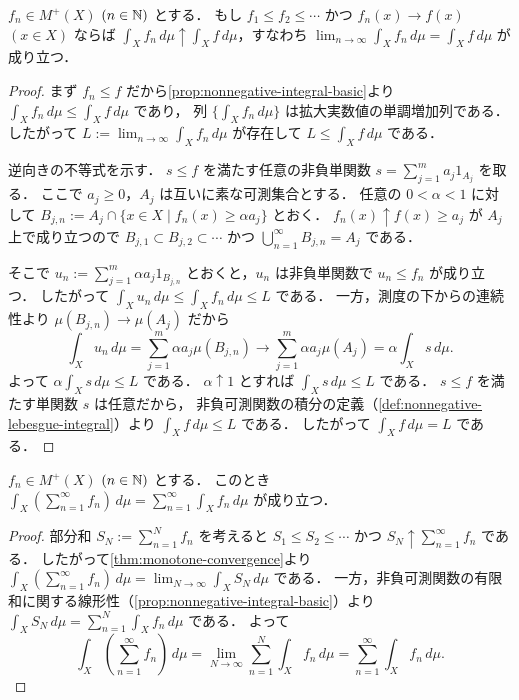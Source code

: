 \begin{theorem}[単調収束定理]\label{thm:monotone-convergence}
$f_n\in M^+(X)$ $(n\in\mathbb N)$ とする．
もし $f_1\le f_2\le \cdots$ かつ $f_n(x)\to f(x)$ $(x \in X)$ ならば
$\int_X f_n\,d\mu \uparrow \int_X f\,d\mu$，すなわち
$\lim_{n\to\infty}\int_X f_n\,d\mu=\int_X f\,d\mu$ が成り立つ．
\end{theorem}
\begin{proof}
まず $f_n \le f$ だから\cref{prop:nonnegative-integral-basic}より
$\int_X f_n\,d\mu\le \int_X f\,d\mu$ であり，
列 $\{\int_X f_n\,d\mu\}$ は拡大実数値の単調増加列である．
したがって $L:=\lim_{n\to\infty}\int_X f_n\,d\mu$ が存在して $L\le \int_X f\,d\mu$ である．

逆向きの不等式を示す．
$s \le f$ を満たす任意の非負単関数 $s=\sum_{j=1}^m a_j1_{A_j}$ を取る．
ここで $a_j\ge 0$，$A_j$ は互いに素な可測集合とする．
任意の $0<\alpha<1$ に対して
$B_{j,n}:=A_j \cap \{x \in X \mid f_n(x)\ge \alpha a_j\}$ とおく．
$f_n(x)\uparrow f(x)\ge a_j$ が $A_j$ 上で成り立つので
$B_{j,1}\subset B_{j,2}\subset \cdots$ かつ $\bigcup_{n=1}^{\infty}B_{j,n}=A_j$ である．

そこで $u_n:=\sum_{j=1}^m \alpha a_j 1_{B_{j,n}}$ とおくと，$u_n$ は非負単関数で $u_n\le f_n$ が成り立つ．
したがって $\int_X u_n\,d\mu\le \int_X f_n\,d\mu\le L$ である．
一方，測度の下からの連続性より $\mu(B_{j,n})\to \mu(A_j)$ だから
\[
\int_X u_n\,d\mu
=\sum_{j=1}^m \alpha a_j \mu(B_{j,n})
\to \sum_{j=1}^m \alpha a_j \mu(A_j)
=\alpha \int_X s\,d\mu.
\]
よって $\alpha \int_X s\,d\mu\le L$ である．
$\alpha \uparrow 1$ とすれば $\int_X s\,d\mu\le L$ である．
$s \le f$ を満たす単関数 $s$ は任意だから，
非負可測関数の積分の定義（\cref{def:nonnegative-lebesgue-integral}）より $\int_X f\,d\mu\le L$ である．
したがって $\int_X f\,d\mu=L$ である．
\end{proof}

\begin{corollary}[非負級数の項別積分]\label{cor:nonnegative-series-termwise-integration}
$f_n\in M^+(X)$ $(n\in\mathbb N)$ とする．
このとき $\int_X (\sum_{n=1}^{\infty}f_n)\,d\mu=\sum_{n=1}^{\infty}\int_X f_n\,d\mu$ が成り立つ．
\end{corollary}
\begin{proof}
部分和 $S_N:=\sum_{n=1}^N f_n$ を考えると
$S_1\le S_2\le \cdots$ かつ $S_N \uparrow \sum_{n=1}^{\infty}f_n$ である．
したがって\cref{thm:monotone-convergence}より
$\int_X (\sum_{n=1}^{\infty}f_n)\,d\mu=\lim_{N\to\infty}\int_X S_N\,d\mu$ である．
一方，非負可測関数の有限和に関する線形性（\cref{prop:nonnegative-integral-basic}）より
$\int_X S_N\,d\mu=\sum_{n=1}^N \int_X f_n\,d\mu$ である．
よって
\[
\int_X \left(\sum_{n=1}^{\infty}f_n\right)\,d\mu
=\lim_{N\to\infty}\sum_{n=1}^N \int_X f_n\,d\mu
=\sum_{n=1}^{\infty}\int_X f_n\,d\mu.
\]
\end{proof}

